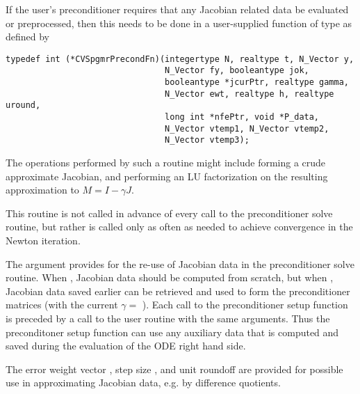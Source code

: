 \begin{itemize}
  If the user's preconditioner requires that any Jacobian related data
  be evaluated or preprocessed, then this needs to be done in a
  user-supplied {\C} function of type  as defined by
\begin{verbatim}
typedef int (*CVSpgmrPrecondFn)(integertype N, realtype t, N_Vector y, 
                                N_Vector fy, booleantype jok, 
                                booleantype *jcurPtr, realtype gamma, 
                                N_Vector ewt, realtype h, realtype uround, 
                                long int *nfePtr, void *P_data, 
                                N_Vector vtemp1, N_Vector vtemp2,
                                N_Vector vtemp3);
\end{verbatim}
  
  The operations performed by such a routine might include forming a crude 
  approximate Jacobian, and performing an LU factorization on the resulting            
  approximation to $M=I - \gamma J$.
  
  This routine is not called in advance of every call to the preconditioner solve
  routine, but rather is called only as often as needed to achieve convergence in the
  Newton iteration. 
  
  The  argument provides for the re-use of
  Jacobian data in the preconditioner solve routine.  When , 
  Jacobian data should be computed from scratch, but when , 
  Jacobian data saved earlier can be retrieved and used to form the 
  preconditioner matrices (with the current $\gamma =$ ).
  Each call to the preconditioner setup function is preceded by a call to     
  the  user routine with the same  arguments.  
  Thus the preconditoner setup function can use any auxiliary data that is 
  computed and saved during the evaluation of the ODE right hand side.

  The error weight vector , step size , and unit roundoff    
   are provided for possible use   
  in approximating Jacobian data, e.g. by difference quotients.
  

\end{itemize}
